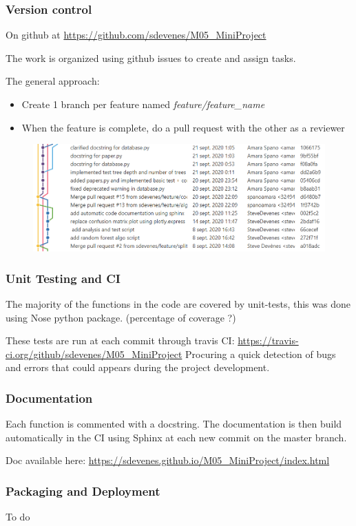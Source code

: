 \documentclass{beamer}
\begin{document}
	\begin{frame}
		\frametitle{Version control}
		On github at \url{https://github.com/sdevenes/M05_MiniProject}

		The work is organized using github issues to create and assign tasks.

		The general approach:
		\begin{itemize}
			\item Create 1 branch per feature named \textit{feature/feature\_name}
			\item When the feature is complete, do a pull request with the other as a reviewer
		\end{itemize}

		\begin{figure}
			\centering
			\includegraphics[width=\linewidth]{img/git_tree.png}
		\end{figure}
	\end{frame}


	\begin{frame}
		\frametitle{Unit Testing and CI}
		The majority of the functions in the code are covered by unit-tests,
		this was done using Nose python package.
		(percentage of coverage ?)

		These tests are run at each commit through travis CI:
		\url{https://travis-ci.org/github/sdevenes/M05_MiniProject}
		Procuring a quick detection of bugs and errors that could appears
		during the project development.
	\end{frame}

	\begin{frame}
		\frametitle{Documentation}
		Each function is commented with a docstring. The documentation is
		then build automatically in the CI using Sphinx at each new commit on the
		master branch.

		Doc available here: \url{https://sdevenes.github.io/M05_MiniProject/index.html}
	\end{frame}

	\begin{frame}
		\frametitle{Packaging and Deployment}
		To do
	\end{frame}

\end{document}
